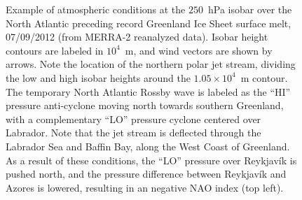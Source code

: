 \documentclass[11pt]{report}
\begin{document}
\begin{figure}[h!]
\centering
{}
\caption[Atmospheric Circulation Around Greenland]{Example of atmospheric conditions at the $250$~hPa isobar over the North Atlantic preceding record Greenland Ice Sheet surface melt, 07/09/2012 (from MERRA-2 reanalyzed data). Isobar height contours are labeled in $10^4$~m, and wind vectors are shown by arrows. Note the location of the northern polar jet stream, dividing the low and high isobar heights around the $1.05\times 10^{4}$~m contour. The temporary North Atlantic Rossby wave is labeled as the ``HI'' pressure anti-cyclone moving north towards southern Greenland, with a complementary ``LO'' pressure cyclone centered over Labrador. Note that the jet stream is deflected through the Labrador Sea and Baffin Bay, along the West Coast of Greenland. As a result of these conditions, the ``LO'' pressure over Reykjav\'ik is pushed north, and the pressure difference between Reykjav\'ik  and Azores is lowered, resulting in an negative NAO index (top left).} \label{fig:jetstream}
\end{figure}
\end{document}
